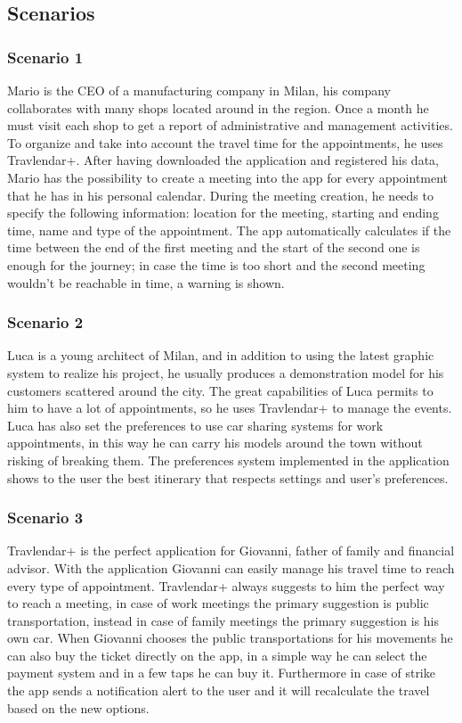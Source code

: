 \subsection{Scenarios}
\subsubsection{Scenario 1}
Mario is the CEO of a manufacturing company in Milan, his company collaborates with many shops located around in the region. Once a month he must visit each shop to get a report of administrative and management activities. To organize and take into account the travel time for the appointments, he uses Travlendar+. After having downloaded the application and registered his data, Mario has the possibility to create a meeting into the app for every appointment that he has in his personal calendar. During the meeting creation, he needs to specify the following information: location for the meeting, starting and ending time, name and type of the appointment. The app automatically calculates if the time between the end of the first meeting and the start of the second one is enough for the journey; in case the time is too short and the second meeting wouldn't be reachable in time, a warning is shown.

\subsubsection{Scenario 2}
Luca is a young architect of Milan, and in addition to using the latest graphic system to realize his project, he usually produces a demonstration model for his customers scattered around the city. The great capabilities of Luca permits to him to have a lot of appointments, so he uses Travlendar+ to manage the events. Luca has also set the preferences to use car sharing systems for work appointments, in this way he can carry his models around the town without risking of breaking them. The preferences system implemented in the application shows  to the user the best itinerary that respects settings and user's preferences.

\subsubsection{Scenario 3}
Travlendar+ is the perfect application for Giovanni, father of family and financial advisor.
With the application Giovanni can easily manage his travel time to reach every type of appointment. Travlendar+ always suggests to him the perfect way to reach a meeting, in case of work meetings the primary suggestion is public transportation, instead in case of family meetings the primary suggestion is his own car. When Giovanni chooses the public transportations for his movements he can also buy the ticket directly on the app, in a simple way he can select the payment system and in a few taps he can buy it. Furthermore in case of strike the app sends a notification alert to the user and it will recalculate the travel based on the new options.

